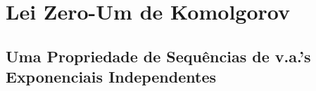 \chapter[Aula 8]{Lei Zero-Um de Komolgorov}
\chaptermark{}

\section{Uma Propriedade de Sequências de v.a.'s Exponenciais Independentes}
